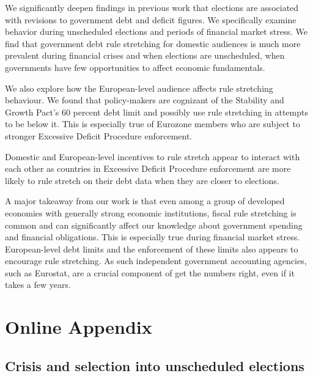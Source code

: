 \documentclass[]{article}
\begin{document}
We significantly deepen findings in previous work that elections are associated with revisions to government debt and deficit figures. We specifically examine behavior during unscheduled elections and periods of financial market stress. We find that government debt rule stretching for domestic audiences is much more prevalent during financial crises and when elections are unscheduled, when governments have few opportunities to affect economic fundamentals.

We also explore how the European-level audience affects rule stretching behaviour. We found that policy-makers are cognizant of the Stability and Growth Pact's 60 percent debt limit and possibly use rule stretching in attempts to be below it. This is especially true of Eurozone members who are subject to stronger Excessive Deficit Procedure enforcement.

Domestic and European-level incentives to rule stretch appear to interact with each other as countries in Excessive Deficit Procedure enforcement are more likely to rule stretch on their debt data when they are closer to elections.

A major takeaway from our work is that even among a group of developed economies with generally strong economic institutions, fiscal rule stretching is common and can significantly affect our knowledge about government spending and financial obligations. This is especially true during financial market stress. European-level debt limits and the enforcement of these limits also appears to encourage rule stretching. As such independent government accounting agencies, such as Eurostat, are a crucial component of get the numbers right, even if it takes a few years.


\clearpage




\pagebreak
\renewcommand{\thepage}{A-\arabic{page}}\setcounter{page}{1}
\renewcommand{\thesection}{Appendix \arabic{section}}\setcounter{section}{0}
\renewcommand{\thetable}{A-\arabic{table}}\setcounter{table}{0}
\renewcommand{\thefigure}{A-\arabic{figure}}\setcounter{figure}{0}
\clearpage

\section*{Online Appendix}

\subsection*{Crisis and selection into unscheduled elections}
\end{document}

